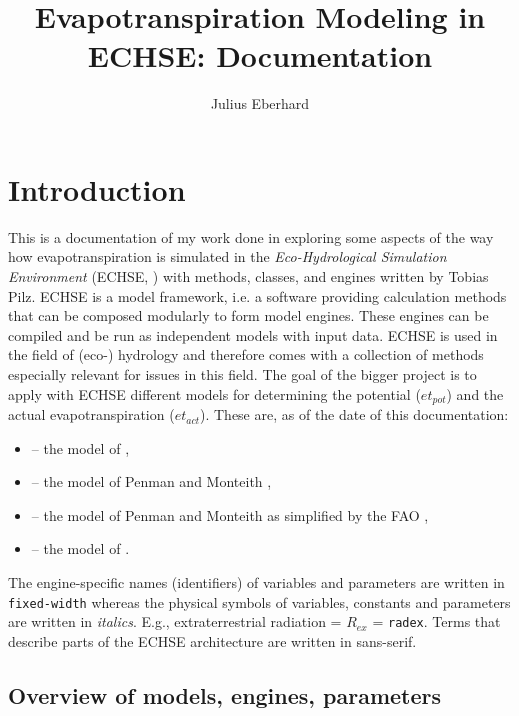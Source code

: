 \documentclass{scrreprt}
\title{Evapotranspiration Modeling in ECHSE: Documentation}
\author{Julius Eberhard}
\newenvironment{denseitem}{
  \begin{itemize}
    \setlength{\itemsep}{0pt}
    \setlength{\parskip}{0pt}
    \setlength{\parsep}{0pt}
}{
  \end{itemize}
}
\begin{document}
\maketitle
\tableofcontents


\chapter{Introduction} \label{ch:introduction}

This is a documentation of my work done in exploring some aspects of the way how evapotranspiration is simulated in the \emph{Eco-Hydrological Simulation Environment} (ECHSE, \citealt{kneis15}) with methods, classes, and engines written by Tobias Pilz.
ECHSE is a model framework, i.e. a software providing calculation methods that can be composed modularly to form model engines. These engines can be compiled and be run as independent models with input data.
ECHSE is used in the field of (eco-) hydrology and therefore comes with a collection of methods especially relevant for issues in this field.
The goal of the bigger project is to apply with ECHSE different models for determining the potential ($et_{pot}$) and the actual evapotranspiration ($et_{act}$).
These are, as of the date of this documentation:
\begin{denseitem}
  \item[--] the model of \citet{makkink57},
  \item[--] the model of Penman and Monteith \citep{monteith65},
  \item[--] the model of Penman and Monteith as simplified by the FAO \citep{fao98},
  \item[--] the model of \citet{shuttleworth85}.
\end{denseitem}

The engine-specific names (identifiers) of variables and parameters are written in \verb!fixed-width! whereas the physical symbols of variables, constants and parameters are written in \textit{italics}.
E.g., extraterrestrial radiation = $R_{ex}$ = \verb!radex!.
Terms that describe parts of the ECHSE architecture are written in \textsf{sans-serif}.

\section{Overview of models, engines, parameters} \label{sec:intro_overview}
\end{document}
